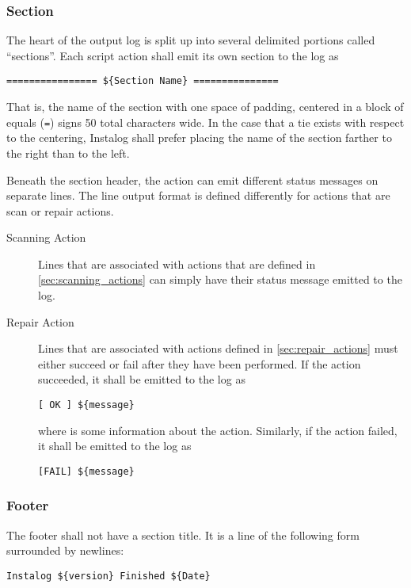 \subsubsection{Section}
The heart of the output log is split up into several delimited portions called
``sections''.  Each script action shall emit its own section to the log as

\begin{verbatim}
================ ${Section Name} ===============
\end{verbatim}

That is, the name of the section with one space of padding, centered in a block
of equals (\verb|=|) signs 50 total characters wide. In the case that a tie
exists with respect to the centering, Instalog shall prefer placing the name of
the section farther to the right than to the left.

Beneath the section header, the action can emit different status messages on
separate lines.  The line output format is defined differently for actions that
are scan or repair actions.
\begin{description}
\item[Scanning Action]
Lines that are associated with actions that are defined in
\ref{sec:scanning_actions} can simply have their status message emitted to the log.
\item[Repair Action] \label{repairoutput}
Lines that are associated with actions defined in \ref{sec:repair_actions} must
either succeed or fail after they have been performed.  If the action succeeded,
it shall be emitted to the log as
\vspace{-\baselineskip}
\begin{verbatim}
[ OK ] ${message}
\end{verbatim}
where  is some information about the action.  Similarly, if the
action failed, it shall be emitted to the log as
\vspace{-\baselineskip}
\begin{verbatim}
[FAIL] ${message}
\end{verbatim}
\end{description}

\subsubsection{Footer}
The footer shall not have a section title. It is a line of the following form
surrounded by newlines:
\begin{verbatim}
Instalog ${version} Finished ${Date}
\end{verbatim}


